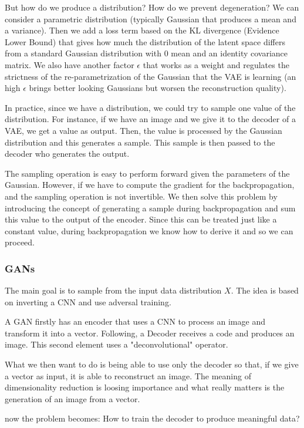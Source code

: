 But how do we produce a distribution? How do we prevent degeneration? We can consider a parametric distribution (typically Gaussian that produces a mean and a variance). Then we add a loss term based on the KL divergence (Evidence Lower Bound) that gives how much the distribution of the latent space differs from a standard Gaussian distribution with 0 mean and an identity covariance matrix. We also have another factor $\epsilon$ that works as a weight and regulates the strictness of the re-parametrization of the Gaussian that the VAE is learning (an high $\epsilon$ brings better looking Gaussians but worsen the reconstruction quality).

In practice, since we have a distribution, we could try to sample one value of the distribution. For instance, if we have an image and we give it to the decoder of a VAE, we get a value as output. Then, the value is processed by the Gaussian distribution and this generates a sample. This sample is then passed to the decoder who generates the output.

The sampling operation is easy to perform forward given the parameters of the Gaussian. However, if we have to compute the gradient for the backpropagation, and the sampling operation is not invertible. We then solve this problem by introducing the concept of generating a sample during backpropagation and sum this value to the output of the encoder. Since this can be treated just like a constant value, during backpropagation we know how to derive it and so we can proceed.

\subsubsection{GANs}

The main goal is to sample from the input data distribution $X$. The idea is based on inverting a CNN and use adversal training. 

A GAN firstly has an encoder that uses a CNN to process an image and transform it into a vector. Following, a Decoder receives a code and produces an image. This second element uses a "deconvolutional" operator.

What we then want to do is being able to use only the decoder so that, if we give a vector as input, it is able to reconstruct an image. The meaning of dimensionality reduction is loosing importance and what really matters is the generation of an image from a vector.

now the problem becomes: How to train the decoder to produce meaningful data? 

